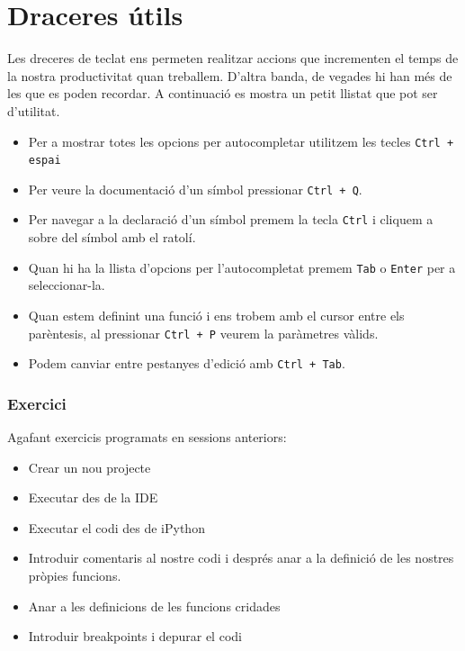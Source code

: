 \section{Draceres útils}

Les dreceres de teclat ens permeten realitzar accions que incrementen el temps de la nostra productivitat quan treballem. D'altra banda, de vegades hi han més de les que es poden recordar. A continuació es mostra un petit llistat que pot ser d'utilitat.

\begin{itemize}
\item Per a mostrar totes les opcions per autocompletar utilitzem les tecles {\tt Ctrl + espai}

\item Per veure la documentació d'un símbol pressionar {\tt Ctrl + Q}.

\item Per navegar a la declaració d'un símbol premem la tecla {\tt Ctrl} i cliquem a sobre del símbol amb el ratolí.

\item Quan hi ha la llista d'opcions per l'autocompletat premem {\tt Tab} o {\tt Enter} per a seleccionar-la.

\item Quan estem definint una funció i ens trobem amb el cursor entre els parèntesis, al pressionar {\tt Ctrl + P} veurem la paràmetres vàlids.

\item Podem canviar entre pestanyes d'edició amb {\tt Ctrl + Tab}.

\end{itemize}


\subsubsection*{Exercici } 

Agafant exercicis programats en sessions anteriors:

\begin{itemize}
\item Crear un nou projecte
\item Executar des de la IDE
\item Executar el codi des de iPython
\item Introduir comentaris al nostre codi i després anar a la definició de les nostres pròpies funcions.
\item Anar a les definicions de les funcions cridades
\item Introduir breakpoints i depurar el codi
\end{itemize}
